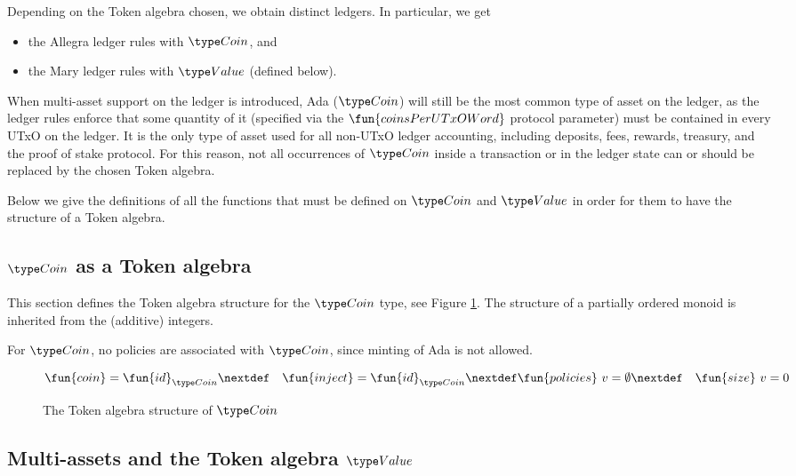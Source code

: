 Depending on the Token algebra chosen, we obtain distinct ledgers. In
particular, we get

\begin{itemize}
  \item the Allegra ledger rules with $\Coin$, and
  \item the Mary ledger rules with $\Value$ (defined below).
\end{itemize}

When multi-asset support on the ledger is introduced, Ada ($\Coin$) will still be
the most common type of asset on the ledger, as the ledger rules enforce that
some quantity of it (specified via
the $\fun{coinsPerUTxOWord}$ protocol parameter) must
be contained in every UTxO on the ledger.
It is the only
type of asset used for all non-UTxO ledger accounting, including deposits,
fees, rewards, treasury, and the proof of stake protocol. For this reason, not
all occurrences of $\Coin$ inside a transaction or in the ledger state can or
should be replaced by the chosen Token algebra.

Below we give the definitions of all the functions that must be defined on
$\Coin$ and $\Value$ in order for them to have the structure of a Token algebra.

\subsection{$\Coin$ as a Token algebra}

This section defines the Token algebra structure for the $\Coin$ type,
see Figure \ref{fig:coin}. The structure of a partially ordered monoid
is inherited from the (additive) integers.

For $\Coin$, no policies are associated with $\Coin$, since minting of Ada is not allowed.

\begin{figure}[htb]
  \begin{align*}
      & \fun{coin} = \fun{id}_{\Coin}
      \nextdef
      & \fun{inject} = \fun{id}_{\Coin}
      \nextdef
      & \fun{policies}~v = \emptyset
      \nextdef
      & \fun{size}~v = 0
  \end{align*}
  \caption{The Token algebra structure of $\Coin$}
  \label{fig:coin}
\end{figure}


\subsection{Multi-assets and the Token algebra $\Value$}

